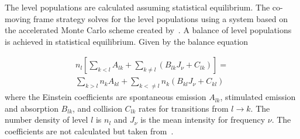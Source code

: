 \documentclass[fleqn,usenatbib]{mnras}
\begin{document}
The level populations are calculated assuming statistical equilibrium. The co-moving frame strategy solves for the level populations using a system based on the accelerated Monte Carlo scheme created by~\citet{Hogerheijde:2000wb}. A balance of level populations is achieved in statistical equilibrium. Given by the balance equation

\begin{multline}
n_{l}\left[ \sum_{k<l}A_{lk} + \sum_{k\neq l}\left( B_{lk}J_{\nu} +C_{lk}\right)\right] = \\
\sum_{k>l}n_{k}A_{kl} + \sum_{k<\neq l} n_{k}\left(B_{kl}J_{\nu}+C_{kl} \right)
\label{eq:balance}
\end{multline}
where the Einstein coefficients are spontaneous emission $A_{lk}$, stimulated emission and absorption $B_{lk}$, and collision $C_{lk}$ rates for transitions from $l\rightarrow k$. The number density of level $l$ is $n_l$ and $J_{\nu}$ is the mean intensity for frequency $\nu$. The coefficients are not calculated but taken from~\citet{Schoier:2005ja}.
\end{document}
